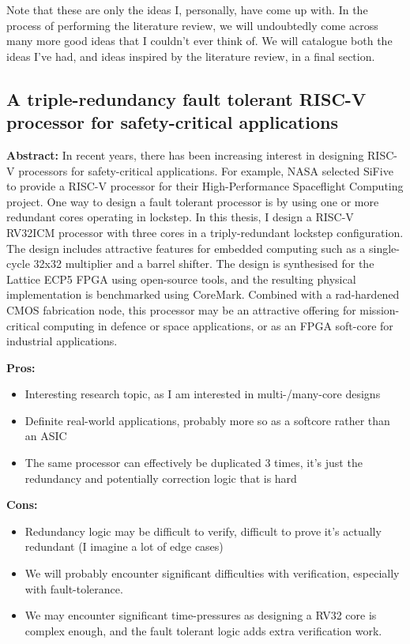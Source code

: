 \documentclass[12pt]{article}
\begin{document}
Note that these are only the ideas I, personally, have come up with. In the process of performing the
literature review, we will undoubtedly come across many more good ideas that I couldn't ever think of.
We will catalogue both the ideas I've had, and ideas inspired by the literature review, in a final section.

\subsection{A triple-redundancy fault tolerant RISC-V processor for safety-critical applications}
\textbf{Abstract:} In recent years, there has been increasing interest in designing RISC-V processors for
safety-critical applications. For example, NASA selected SiFive to provide a RISC-V processor for their 
High-Performance Spaceflight Computing project. One way to design a fault tolerant processor is by using
one or more redundant cores operating in lockstep. In this thesis, I design a RISC-V RV32ICM processor with
three cores in a triply-redundant lockstep configuration. The design includes attractive features for embedded 
computing such as a single-cycle 32x32 multiplier and a barrel shifter. The design is synthesised for
the Lattice ECP5 FPGA using open-source tools, and the resulting physical implementation is benchmarked using
CoreMark. Combined with a rad-hardened CMOS fabrication node, this processor may be an attractive offering for
mission-critical computing in defence or space applications, or as an FPGA soft-core for industrial applications.

\textbf{Pros:}

\begin{itemize}
    \item Interesting research topic, as I am interested in multi-/many-core designs
    \item Definite real-world applications, probably more so as a softcore rather than an ASIC
    \item The same processor can effectively be duplicated 3 times, it's just the redundancy and potentially
	correction logic that is hard
\end{itemize}

\textbf{Cons:}

\begin{itemize}
    \item Redundancy logic may be difficult to verify, difficult to prove it's actually redundant (I imagine
	a lot of edge cases)
    \item We will probably encounter significant difficulties with verification, especially with
	fault-tolerance.
    \item We may encounter significant time-pressures as designing a RV32 core is complex enough, and the
	fault tolerant logic adds extra verification work.
\end{itemize}
\end{document}
